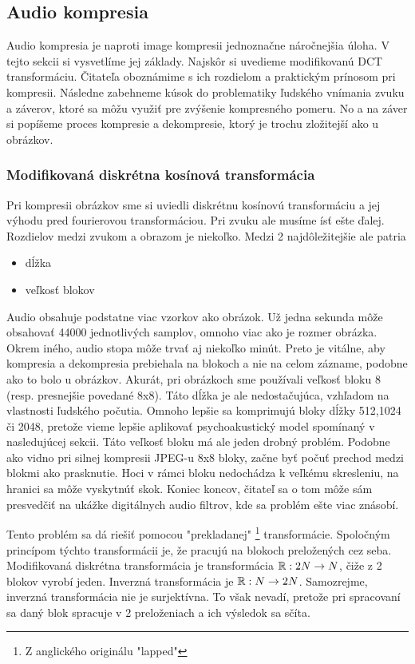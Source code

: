\subsection{Audio kompresia}

Audio kompresia je naproti image kompresii jednoznačne náročnejšia
úloha. V tejto sekcii si vysvetlíme jej základy. Najskôr si uvedieme
modifikovanú DCT transformáciu. Čitateľa oboznámime s ich rozdielom a
praktickým prínosom pri kompresii. Následne zabehneme kúsok do
problematiky ľudského vnímania zvuku a záverov, ktoré sa môžu využiť
pre zvýšenie kompresného pomeru. No a na záver si popíšeme proces
kompresie a dekompresie, ktorý je trochu zložitejší ako u obrázkov.

\subsubsection{Modifikovaná diskrétna kosínová transformácia}
Pri kompresii obrázkov sme si uviedli diskrétnu kosínovú
transformáciu a jej výhodu pred fourierovou transformáciou. Pri zvuku
ale musíme ísť ešte ďalej. Rozdielov medzi zvukom a obrazom je
niekoľko. Medzi 2 najdôležitejšie ale patria
\begin{itemize}
\item dĺžka
\item veľkosť blokov
\end{itemize}
Audio obsahuje podstatne viac vzorkov ako obrázok. Už jedna sekunda
môže obsahovať 44000 jednotlivých samplov, omnoho viac ako je rozmer
obrázka. Okrem iného, audio stopa môže trvať aj niekoľko minút. Preto
je vitálne, aby kompresia a dekompresia prebiehala na blokoch a nie na
celom zázname, podobne ako to bolo u obrázkov. Akurát, pri obrázkoch
sme používali veľkosť bloku 8 (resp. presnejšie povedané 8x8). Táto
dĺžka je ale nedostačujúca, vzhľadom na vlastnosti ľudského počutia.
Omnoho lepšie sa komprimujú bloky dĺžky 512,1024 či 2048, pretože
vieme lepšie aplikovať psychoakustický model spomínaný v nasledujúcej
sekcii. Táto veľkosť bloku má ale jeden drobný problém. Podobne ako
vidno pri silnej kompresii JPEG-u 8x8 bloky, začne byť počuť prechod
medzi blokmi ako prasknutie. Hoci v rámci bloku nedochádza k veľkému
skresleniu, na hranici sa môže vyskytnúť skok. Koniec koncov, čitateľ
sa o tom môže sám presvedčiť na ukážke digitálnych audio filtrov, kde
sa problém ešte viac znásobí.

Tento problém sa dá riešiť pomocou "prekladanej" \footnote{Z
anglického originálu "lapped"} transformácie. Spoločným princípom
týchto transformácii je, že pracujú na blokoch preložených cez seba.
Modifikovaná diskrétna transformácia je transformácia ${\mathbb R}: 2N \rightarrow
N$, čiže z 2 blokov vyrobí jeden. Inverzná transformácia je
${\mathbb R}: N \rightarrow 2N$. Samozrejme, inverzná transformácia nie je
surjektívna. To však nevadí, pretože pri spracovaní sa daný blok
spracuje v 2 preloženiach a ich výsledok sa sčíta.

